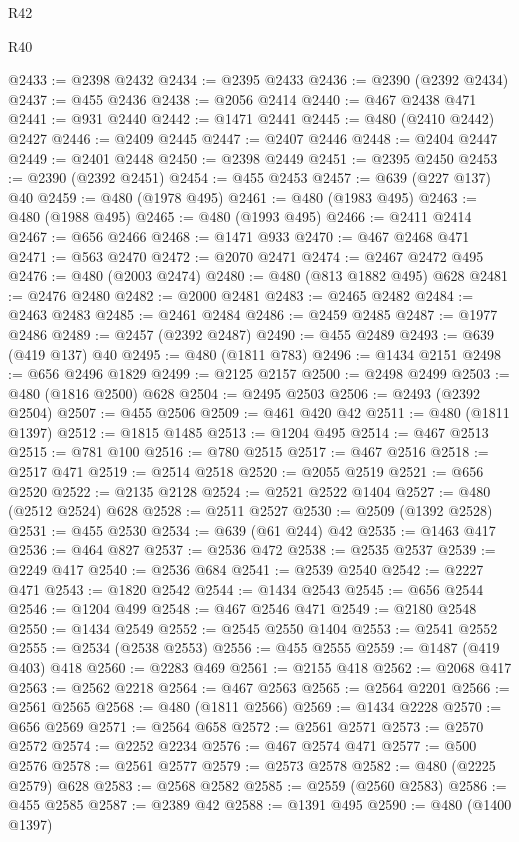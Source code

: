 \begin{lexlean}{R42}
\begin{lexlean}{R40}
\begin{coremodule}
{{{{{{{{{{{{{{{{{{{{{{{{{{{{{{{{{{{{{{{{{{{{{{{{{{{{{{{{{{{{{{{{{{{{{{{{{{{{{{{{{{{{{{{{{{{{{{{{{{{{{{{{{{{{{@2433 := @2398 @2432
@2434 := @2395 @2433
@2436 := @2390 (@2392 @2434)
@2437 := @455 @2436
@2438 := @2056 @2414
@2440 := @467 @2438 @471
@2441 := @931 @2440
@2442 := @1471 @2441
@2445 := @480 (@2410 @2442) @2427
@2446 := @2409 @2445
@2447 := @2407 @2446
@2448 := @2404 @2447
@2449 := @2401 @2448
@2450 := @2398 @2449
@2451 := @2395 @2450
@2453 := @2390 (@2392 @2451)
@2454 := @455 @2453
@2457 := @639 (@227 @137) @40
@2459 := @480 (@1978 @495)
@2461 := @480 (@1983 @495)
@2463 := @480 (@1988 @495)
@2465 := @480 (@1993 @495)
@2466 := @2411 @2414
@2467 := @656 @2466
@2468 := @1471 @933
@2470 := @467 @2468 @471
@2471 := @563 @2470
@2472 := @2070 @2471
@2474 := @2467 @2472 @495
@2476 := @480 (@2003 @2474)
@2480 := @480 (@813 @1882 @495) @628
@2481 := @2476 @2480
@2482 := @2000 @2481
@2483 := @2465 @2482
@2484 := @2463 @2483
@2485 := @2461 @2484
@2486 := @2459 @2485
@2487 := @1977 @2486
@2489 := @2457 (@2392 @2487)
@2490 := @455 @2489
@2493 := @639 (@419 @137) @40
@2495 := @480 (@1811 @783)
@2496 := @1434 @2151
@2498 := @656 @2496 @1829
@2499 := @2125 @2157
@2500 := @2498 @2499
@2503 := @480 (@1816 @2500) @628
@2504 := @2495 @2503
@2506 := @2493 (@2392 @2504)
@2507 := @455 @2506
@2509 := @461 @420 @42
@2511 := @480 (@1811 @1397)
@2512 := @1815 @1485
@2513 := @1204 @495
@2514 := @467 @2513
@2515 := @781 @100
@2516 := @780 @2515
@2517 := @467 @2516
@2518 := @2517 @471
@2519 := @2514 @2518
@2520 := @2055 @2519
@2521 := @656 @2520
@2522 := @2135 @2128
@2524 := @2521 @2522 @1404
@2527 := @480 (@2512 @2524) @628
@2528 := @2511 @2527
@2530 := @2509 (@1392 @2528)
@2531 := @455 @2530
@2534 := @639 (@61 @244) @42
@2535 := @1463 @417
@2536 := @464 @827
@2537 := @2536 @472
@2538 := @2535 @2537
@2539 := @2249 @417
@2540 := @2536 @684
@2541 := @2539 @2540
@2542 := @2227 @471
@2543 := @1820 @2542
@2544 := @1434 @2543
@2545 := @656 @2544
@2546 := @1204 @499
@2548 := @467 @2546 @471
@2549 := @2180 @2548
@2550 := @1434 @2549
@2552 := @2545 @2550 @1404
@2553 := @2541 @2552
@2555 := @2534 (@2538 @2553)
@2556 := @455 @2555
@2559 := @1487 (@419 @403) @418
@2560 := @2283 @469
@2561 := @2155 @418
@2562 := @2068 @417
@2563 := @2562 @2218
@2564 := @467 @2563
@2565 := @2564 @2201
@2566 := @2561 @2565
@2568 := @480 (@1811 @2566)
@2569 := @1434 @2228
@2570 := @656 @2569
@2571 := @2564 @658
@2572 := @2561 @2571
@2573 := @2570 @2572
@2574 := @2252 @2234
@2576 := @467 @2574 @471
@2577 := @500 @2576
@2578 := @2561 @2577
@2579 := @2573 @2578
@2582 := @480 (@2225 @2579) @628
@2583 := @2568 @2582
@2585 := @2559 (@2560 @2583)
@2586 := @455 @2585
@2587 := @2389 @42
@2588 := @1391 @495
@2590 := @480 (@1400 @1397)
}}}}}}}}}}}}}}}}}}}}}}}}}}}}}}}}}}}}}}}}}}}}}}}}}}}}}}}}}}}}}}}}}}}}}}}}}}}}}}}}}}}}}}}}}}}}}}}}}}}}}}}}}}}}}
\end{coremodule}
\end{lexlean}
\end{lexlean}
